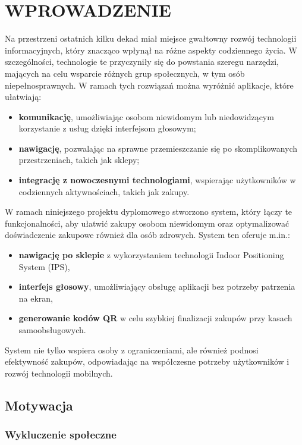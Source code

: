 \chapter{WPROWADZENIE}
\label{chapter:wprowadzenie}

Na przestrzeni ostatnich kilku dekad miał miejsce gwałtowny rozwój technologii informacyjnych, który znacząco wpłynął na różne aspekty codziennego życia. W szczególności, technologie te przyczyniły się do powstania szeregu narzędzi, mających na celu wsparcie różnych grup społecznych, w tym osób niepełnosprawnych. W ramach tych rozwiązań można wyróżnić aplikacje, które ułatwiają:
\begin{itemize}
    \item \textbf{komunikację}, umożliwiając osobom niewidomym lub niedowidzącym korzystanie z usług dzięki interfejsom głosowym;
    \item \textbf{nawigację}, pozwalając na sprawne przemieszczanie się po skomplikowanych przestrzeniach, takich jak sklepy;
    \item \textbf{integrację z nowoczesnymi technologiami}, wspierając użytkowników w codziennych aktywnościach, takich jak zakupy.
\end{itemize}

W ramach niniejszego projektu dyplomowego stworzono system, który łączy te funkcjonalności, aby ułatwić zakupy osobom niewidomym oraz optymalizować doświadczenie zakupowe również dla osób zdrowych. System ten oferuje m.in.:
\begin{itemize}
    \item \textbf{nawigację po sklepie} z wykorzystaniem technologii Indoor Positioning System (IPS),
    \item \textbf{interfejs głosowy}, umożliwiający obsługę aplikacji bez potrzeby patrzenia na ekran,
    \item \textbf{generowanie kodów QR} w celu szybkiej finalizacji zakupów przy kasach samoobsługowych.
\end{itemize}

System nie tylko wspiera osoby z ograniczeniami, ale również podnosi efektywność zakupów, odpowiadając na współczesne potrzeby użytkowników i rozwój technologii mobilnych.
\section{Motywacja}

\subsection{Wykluczenie społeczne}


